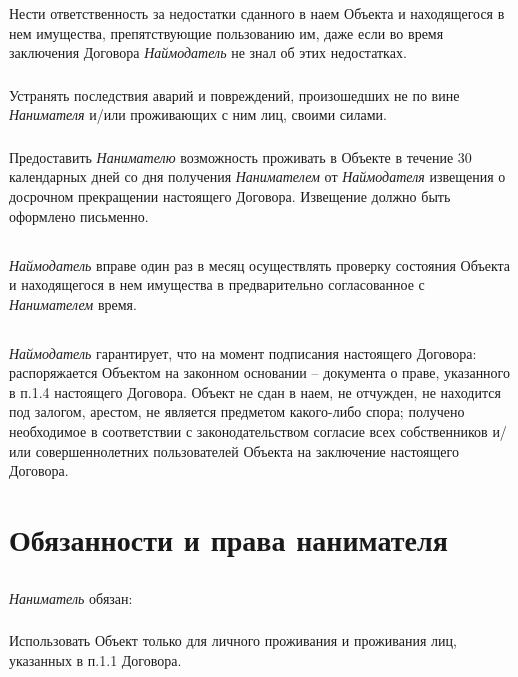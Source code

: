 \documentclass[a4paper, 11pt]{article}
\begin{document}
\subsubsection{} Нести ответственность за недостатки сданного в наем Объекта и
находящегося в нем имущества, препятствующие пользованию им, даже если во время
заключения Договора \textit{Наймодатель} не знал об этих недостатках.
\subsubsection{} Устранять последствия аварий и повреждений, произошедших не по вине
\textit{Нанимателя} и/или проживающих с ним лиц, своими силами.
\subsubsection{} Предоставить \textit{Нанимателю} возможность проживать в Объекте в течение
30 календарных дней со дня получения \textit{Нанимателем} от
\textit{Наймодателя} извещения
о досрочном прекращении настоящего Договора. Извещение должно быть оформлено
письменно.
\subsection{} \textit{Наймодатель} вправе один раз в месяц осуществлять проверку состояния Объекта
и находящегося в нем имущества в предварительно согласованное с
\textit{Нанимателем}
время.
\subsection{} \textit{Наймодатель} гарантирует, что на момент подписания настоящего Договора:
распоряжается Объектом на законном основании -- документа о праве, указанного в
п.1.4 настоящего Договора. Объект не сдан в наем, не отчужден, не находится под
залогом, арестом, не является предметом какого-либо спора; получено необходимое
в соответствии с законодательством согласие всех собственников и/или
совершеннолетних пользователей Объекта на заключение настоящего Договора.

\section{Обязанности и права нанимателя}
\subsection{} \textit{Наниматель} обязан:
\subsubsection{} Использовать Объект только для личного проживания и проживания лиц,
указанных в п.1.1 Договора.
\end{document}

